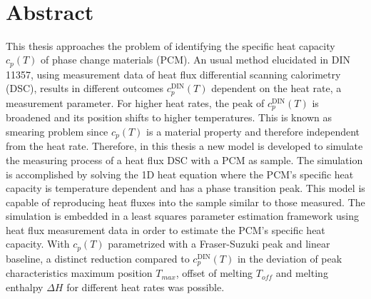 \documentclass{scrartcl}[12pt, halfparskip]
\numberwithin{equation}{section}
\numberwithin{figure}{section}
\numberwithin{table}{section}
\begin{document}
\newpage


\begin{titlepage}
	\mbox{}\\
\end{titlepage}



\section*{Abstract}

This thesis approaches the problem of identifying the specific heat capacity $c_p(T)$ of phase change materials (PCM). 
An usual method elucidated in DIN 11357, using measurement data of heat flux differential scanning calorimetry (DSC), results in different outcomes $c_p^{\text{DIN}}(T)$ dependent on the heat rate, a measurement parameter. For higher heat rates, the peak of $c_p^{\text{DIN}}(T)$ is broadened and its position shifts to higher temperatures. This is known as smearing problem since $c_p(T)$ is a material property and therefore independent from the heat rate.
Therefore, in this thesis a new model is developed to simulate the measuring process of a heat flux DSC with a PCM as sample.
The simulation is accomplished by solving the 1D heat equation where the PCM's specific heat capacity is temperature dependent and has a phase transition peak. 
This model is capable of reproducing heat fluxes into the sample similar to those measured. 
The simulation is embedded in a least squares parameter estimation framework using heat flux measurement data in order to estimate the PCM's specific heat capacity. 
With $c_p(T)$ parametrized with a Fraser-Suzuki peak and linear baseline, a distinct reduction compared to $c_p^{\text{DIN}}(T)$ in the deviation of peak characteristics maximum position $T_{max}$, offset of melting $T_{off}$ and melting enthalpy $\Delta H$ for different heat rates was possible.
\end{document}

